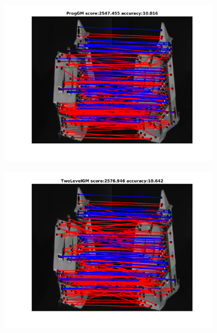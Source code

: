 \begin{figure}[h] 		
	\begin{subfigure}[b]{0.3\textwidth}
		\centering
		\includegraphics[scale=0.25]{"chapter3/fig/HouseSeq/anchor_descr/using_cpd_afftrafo/solution/fi_4_ProgGM"}  
	\end{subfigure}%
	\begin{subfigure}[b]{0.3\textwidth}
		\centering
		\includegraphics[scale=0.25]{"chapter3/fig/HouseSeq/anchor_descr/using_cpd_afftrafo/solution/fi_4_TwoLevelGM"}  
	\end{subfigure} 
	\begin{subfigure}[b]{0.3\textwidth}
		\centering

\end{subfigure}
\end{figure}
